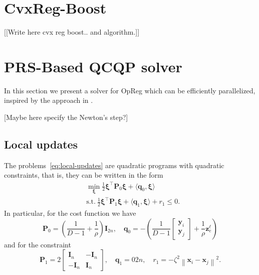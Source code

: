 \documentclass{article}
\newcommand{\norm}[1]{\left\lVert#1\right\rVert}
\newcommand{\q}{\mathbold{q}}
\newcommand{\x}{\mathbold{x}}
\newcommand{\y}{\mathbold{y}}
\newcommand{\z}{\mathbold{z}}
\newcommand{\xx}{\pmb{\xi}}
\renewcommand{\Im}{\mathbold{I}}
\newcommand{\Pm}{\mathbold{P}}
\newcommand{\andrea}[1]{{\color{red}[#1]}}
\begin{document}
\newpage 





\newpage
\appendix

\section{CvxReg-Boost}

\andrea{[Write here cvx reg boost.. and algorithm.]}



\section{PRS-Based QCQP solver}
In this section we present a solver for OpReg which can be efficiently parallelized, inspired by the approach in \cite{simonetto_smooth_2021}.

[Maybe here specify the Newton's step?]

\subsection{Local updates}
The problems~\eqref{eq:local-updates} are quadratic programs with quadratic constraints, that is, they can be written in the form
\begin{subequations}
\begin{align}
	&\min_{\xx} \frac{1}{2} \xx^\top \Pm_0 \xx + \langle \q_0, \xx \rangle \\
	&\text{s.t.} \ \frac{1}{2} \xx^\top \Pm_1 \xx + \langle \q_1, \xx \rangle + r_1 \leq 0.
\end{align}
\end{subequations}
In particular, for the cost function we have
$$
	\Pm_0 = \left( \frac{1}{D-1} + \frac{1}{\rho} \right) \Im_{2n}, \quad \q_0 = - \left( \frac{1}{D-1} \begin{bmatrix} \y_i \\ \y_j \end{bmatrix} + \frac{1}{\rho} \z_e^\ell \right)
$$
and for the constraint
$$
	\Pm_1 = 2 \begin{bmatrix} \Im_n & - \Im_n \\ - \Im_n & \Im_n \end{bmatrix}, \quad \q_1 = 0{2n}, \quad r_1 = - \zeta^2 \norm{\x_i - \x_j}^2.
$$
\end{document}
